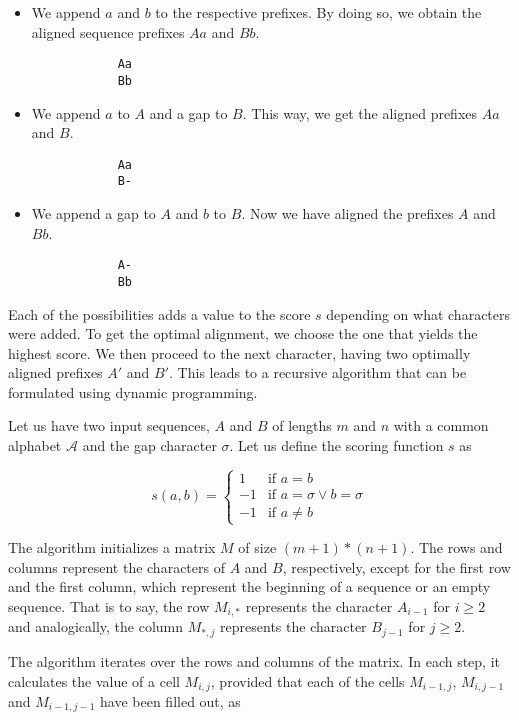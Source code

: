 \begin{itemize}
    \item We append $a$ and $b$ to the respective prefixes. By doing so, we obtain the aligned sequence prefixes $Aa$ and $Bb$.
        \begin{verbatim}
            Aa
            Bb
        \end{verbatim}
    \item We append $a$ to $A$ and a gap to $B$. This way, we get the aligned prefixes $Aa$ and $B$.
        \begin{verbatim}
            Aa
            B-
        \end{verbatim}
    \item We append a gap to $A$ and $b$ to $B$. Now we have aligned the prefixes $A$ and $Bb$.
        \begin{verbatim}
            A-
            Bb
        \end{verbatim}
\end{itemize}

Each of the possibilities adds a value to the score $s$ depending on what characters were added. To get the optimal alignment, we choose the one
that yields the highest score. We then proceed to the next character, having two optimally aligned prefixes $A'$ and $B'$. This leads to a recursive
algorithm that can be formulated using dynamic programming.

Let us have two input sequences, $A$ and $B$ of lengths $m$ and $n$ with a common alphabet $\mathcal{A}$ and the gap character $\sigma$.
Let us define the scoring function $s$ as

\[ s(a, b) = 
    \begin{cases}
        1  & \text{if } a = b \\
        -1 & \text{if } a = \sigma \lor b = \sigma \\
        -1 & \text{if }  a \neq b
    \end{cases}
\]

The algorithm initializes a matrix $M$ of size $(m+1) * (n+1)$. The rows and columns represent the characters of $A$ and $B$, respectively, except
for the first row and the first column, which represent the beginning of a sequence or an empty sequence. That is to say, the row $M_{i, *}$ represents the
character $A_{i-1}$ for $i \geq 2$ and analogically, the column $M_{*, j}$ represents the character $B_{j-1}$ for $j \geq 2$.

The algorithm iterates over the rows and columns of the matrix. In each step, it calculates the value of a cell $M_{i,j}$, provided that each of the cells $M_{i-1, j}$,
$M_{i, j-1}$ and $M_{i-1, j-1}$ have been filled out, as

